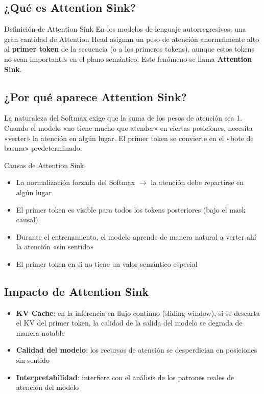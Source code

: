 \documentclass[a4paper]{article}
\begin{document}
\subsection{¿Qué es Attention Sink?}

\begin{importantbox}{Definición de Attention Sink}
En los modelos de lenguaje autorregresivos, una gran cantidad de Attention Head asignan un peso de atención anormalmente alto al \textbf{primer token} de la secuencia (o a los primeros tokens), aunque estos tokens no sean importantes en el plano semántico. Este fenómeno se llama \textbf{Attention Sink}.
\end{importantbox}

\subsection{¿Por qué aparece Attention Sink?}

La naturaleza del Softmax exige que la suma de los pesos de atención sea 1. Cuando el modelo «no tiene mucho que atender» en ciertas posiciones, necesita «verter» la atención en algún lugar. El primer token se convierte en el «bote de basura» predeterminado:

\begin{warningbox}{Causas de Attention Sink}
\begin{itemize}
  \item La normalización forzada del Softmax $\to$ la atención debe repartirse en algún lugar
  \item El primer token es visible para todos los tokens posteriores (bajo el mask causal)
  \item Durante el entrenamiento, el modelo aprende de manera natural a verter ahí la atención «sin sentido»
  \item El primer token en sí no tiene un valor semántico especial
\end{itemize}
\end{warningbox}

\subsection{Impacto de Attention Sink}

\begin{itemize}
  \item \textbf{KV Cache}: en la inferencia en flujo continuo (sliding window), si se descarta el KV del primer token, la calidad de la salida del modelo se degrada de manera notable
  \item \textbf{Calidad del modelo}: los recursos de atención se desperdician en posiciones sin sentido
  \item \textbf{Interpretabilidad}: interfiere con el análisis de los patrones reales de atención del modelo
\end{itemize}
\end{document}
